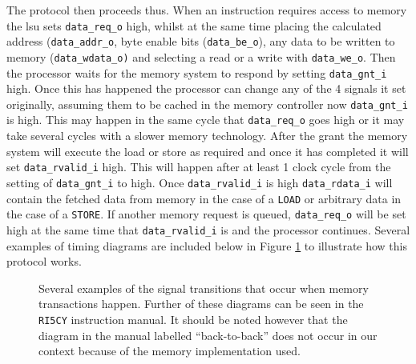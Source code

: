 The protocol then proceeds thus. When an instruction requires access to memory the \gls{lsu} sets \texttt{data\_req\_o} high, whilst at the same time placing the calculated address (\texttt{data\_addr\_o}, byte enable bits (\texttt{data\_be\_o}), any data to be written to memory (\texttt{data\_wdata\_o)} and selecting a read or a write with \texttt{data\_we\_o}. Then the processor waits for the memory system to respond by setting \texttt{data\_gnt\_i} high. Once this has happened the processor can change any of the 4 signals it set originally, assuming them to be cached in the memory controller now \texttt{data\_gnt\_i} is high. This may happen in the same cycle that \texttt{data\_req\_o} goes high or it may take several cycles with a slower memory technology. After the grant the memory system will execute the load or store as required and once it has completed it will set \texttt{data\_rvalid\_i} high. This will happen after at least 1 clock cycle from the setting of \texttt{data\_gnt\_i} to high. Once \texttt{data\_rvalid\_i} is high \texttt{data\_rdata\_i} will contain the fetched data from memory in the case of a \texttt{LOAD} or arbitrary data in the case of a \texttt{STORE}. If another memory request is queued, \texttt{data\_req\_o} will be set high at the same time that \texttt{data\_rvalid\_i} is and the processor continues. Several examples of timing diagrams are included below in Figure \ref{fig:memory-protocol} to illustrate how this protocol works.
	
\begin{figure}[htbp]
	\begin{subfigure}{\textwidth}
		
	\end{subfigure}
	\begin{subfigure}{\textwidth}
		
	\end{subfigure}
	\begin{subfigure}{\textwidth}
		
	\end{subfigure}
	\caption{Several examples of the signal transitions that occur when memory transactions happen. Further of these diagrams can be seen in the \texttt{RI5CY} instruction manual. It should be noted however that the diagram in the manual labelled ``back-to-back'' does not occur in our context because of the memory implementation used.}
	\label{fig:memory-protocol}
\end{figure}

